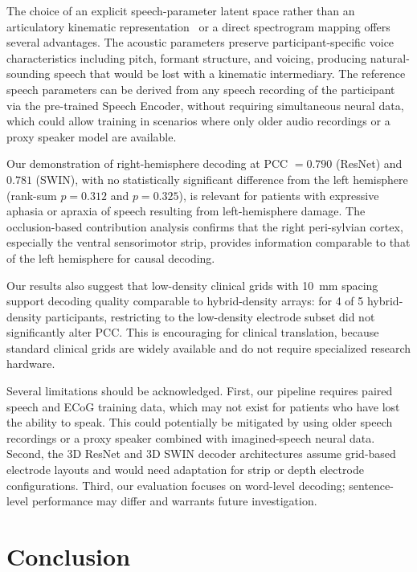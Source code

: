 \documentclass[10pt]{article}
\begin{document}
The choice of an explicit speech-parameter latent space rather than an articulatory kinematic representation~\cite{anumanchipalli2019speech} or a direct spectrogram mapping offers several advantages. The acoustic parameters preserve participant-specific voice characteristics including pitch, formant structure, and voicing, producing natural-sounding speech that would be lost with a kinematic intermediary. The reference speech parameters can be derived from any speech recording of the participant via the pre-trained Speech Encoder, without requiring simultaneous neural data, which could allow training in scenarios where only older audio recordings or a proxy speaker model are available.

Our demonstration of right-hemisphere decoding at PCC $=0.790$ (ResNet) and $0.781$ (SWIN), with no statistically significant difference from the left hemisphere (rank-sum $p=0.312$ and $p=0.325$), is relevant for patients with expressive aphasia or apraxia of speech resulting from left-hemisphere damage. The occlusion-based contribution analysis confirms that the right peri-sylvian cortex, especially the ventral sensorimotor strip, provides information comparable to that of the left hemisphere for causal decoding.

Our results also suggest that low-density clinical grids with 10~mm spacing support decoding quality comparable to hybrid-density arrays: for 4 of 5 hybrid-density participants, restricting to the low-density electrode subset did not significantly alter PCC. This is encouraging for clinical translation, because standard clinical grids are widely available and do not require specialized research hardware.

Several limitations should be acknowledged. First, our pipeline requires paired speech and ECoG training data, which may not exist for patients who have lost the ability to speak. This could potentially be mitigated by using older speech recordings or a proxy speaker combined with imagined-speech neural data. Second, the 3D ResNet and 3D SWIN decoder architectures assume grid-based electrode layouts and would need adaptation for strip or depth electrode configurations. Third, our evaluation focuses on word-level decoding; sentence-level performance may differ and warrants future investigation.

\section{Conclusion}
\end{document}
